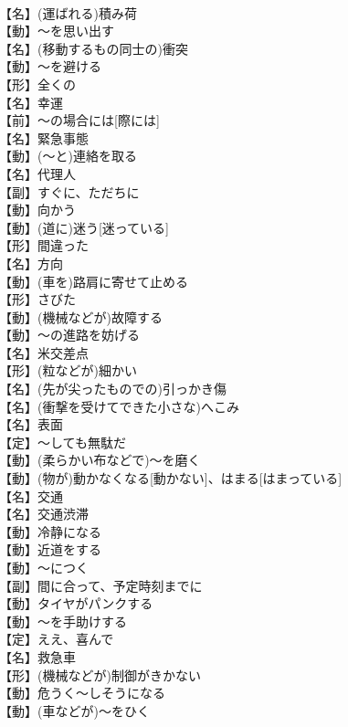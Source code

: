 \documentclass[8pt]{extreport}
\begin{document}
\begin{CJK}{UTF8}{min}
\\	【名】(運ばれる)積み荷
\\	【動】～を思い出す
\\	【名】(移動するもの同士の)衝突
\\	【動】～を避ける
\\	【形】全くの
\\	【名】幸運
\\	【前】～の場合には[際には]
\\	【名】緊急事態
\\	【動】(～と)連絡を取る
\\	【名】代理人
\\	【副】すぐに、ただちに
\\	【動】向かう
\\	【動】(道に)迷う[迷っている]
\\	【形】間違った
\\	【名】方向
\\	【動】(車を)路肩に寄せて止める
\\	【形】さびた
\\	【動】(機械などが)故障する
\\	【動】～の進路を妨げる
\\	【名】{米}交差点
\\	【形】(粒などが)細かい
\\	【名】(先が尖ったものでの)引っかき傷
\\	【名】(衝撃を受けてできた小さな)へこみ
\\	【名】表面
\\	【定】～しても無駄だ
\\	【動】(柔らかい布などで)～を磨く
\\	【動】(物が)動かなくなる[動かない]、はまる[はまっている]
\\	【名】交通
\\	【名】交通渋滞
\\	【動】冷静になる
\\	【動】近道をする
\\	【動】～につく
\\	【副】間に合って、予定時刻までに
\\	【動】タイヤがパンクする
\\	【動】～を手助けする
\\	【定】ええ、喜んで
\\	【名】救急車
\\	【形】(機械などが)制御がきかない
\\	【動】危うく～しそうになる
\\	【動】(車などが)～をひく

\end{CJK}
\end{document}
